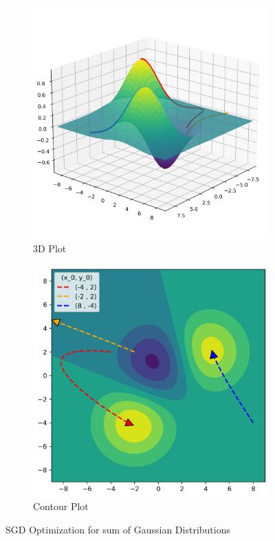 \begin{figure}[H]
\begin{subfigure}{.5\textwidth}
    \center
    \includegraphics[scale=0.4]{notebooks/DL/img/3d_sgd.png}
    \caption{3D Plot}
\end{subfigure}%
\begin{subfigure}{.5\textwidth}
    \center
    \includegraphics[scale=0.4]{notebooks/DL/img/contourf_sgd.png}
    \caption{Contour Plot}
\end{subfigure}
\caption{SGD Optimization for sum of Gaussian Distributions}
\end{figure}

